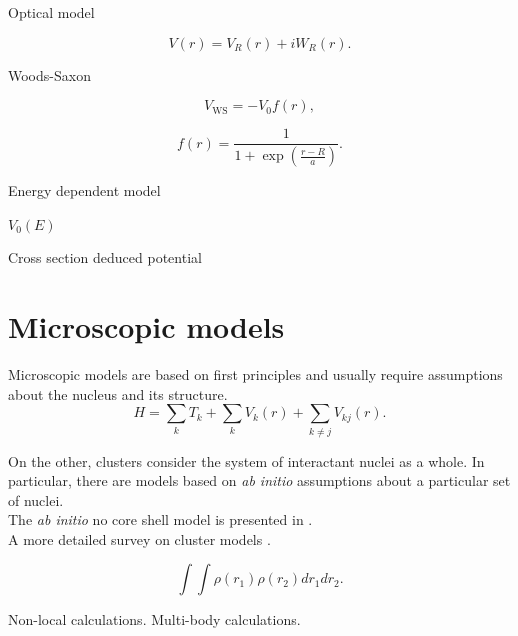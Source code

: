 \documentclass[openany]{book}
\begin{document}
Optical model \cite{amer_penionzhkevich_2021}

\begin{equation}
	V(r) = V_R(r) + iW_R(r).
\end{equation}

Woods-Saxon \cite{salamon_baran_vertse_2016}
\cite{singh_sukhvinder_kharab_2013A}

\begin{equation}
	V_{\mathrm{WS}} = -V_0 f(r),
\end{equation}

\begin{equation}
	f(r) = \frac{1}{1 + \exp {\left(\frac{r- R}{a}\right)}}.
\end{equation}

Energy dependent model \cite{singh_sukhvinder_kharab_2013B}

$V_0(E)$

Cross section deduced potential \cite{bass_1977} \cite{nandi_swami_gupta_kumar_chakraborty_manjunatha_2022}


\section{Microscopic models} \label{sec:microscopicalModels}

Microscopic models are based on first principles and usually require assumptions about the nucleus and its structure. \\ 

\begin{equation}
	H = \sum_{k} T_k + \sum_{k} V_k (r) + \sum_{k \neq j} V_{kj}(r).
\end{equation}

On the other, clusters consider the system of interactant nuclei as a whole. In particular, there are models based on \textit{ab initio} assumptions about a particular set of nuclei.  \\



The \textit{ab initio} no core shell model is presented in \cite{barrett_navratil_vary_2013}. \\

A more detailed survey on cluster models \cite{beck_2012}.

\begin{equation}
	\int \int \rho(r_1) \rho(r_2) dr_1 dr_2. 
\end{equation}

Non-local calculations. Multi-body calculations. \\
\end{document}

